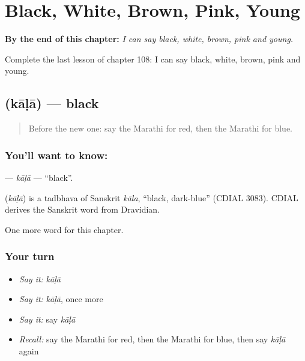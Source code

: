
\chapter{Black, White, Brown, Pink, Young}
\label{ch:mr-black-white-brown-pink-young}

\begin{chapteropening}
\textbf{By the end of this chapter:} \emph{I can say black, white, brown, pink and young.}

Complete the last lesson of chapter 108: I can say black, white, brown, pink and young.
\end{chapteropening}

\section[\texorpdfstring{\mr{काळा} (kāḷā)}{काळा (kāḷā)}]{ (kāḷā) — black}

\label{lesson:MR-C108-kala}



\begin{quote}
Before the new one: say the Marathi for red, then the Marathi for blue.
\end{quote}

\subsection*{You'll want to know: }
\textbf{} — \emph{kāḷā} — \textquotedblleft{}black\textquotedblright{}.

\begin{cousinweb}
\textbf{} (\emph{kāḷā}) is a tadbhava of Sanskrit \emph{kāla}, \textquotedblleft{}black, dark-blue\textquotedblright{} (CDIAL 3083). CDIAL derives the Sanskrit word from Dravidian.
\end{cousinweb}

\begin{grammarlens}[title={What you've built}]
One more word for this chapter.
\end{grammarlens}

\subsection*{Your turn}
\begin{itemize}
\raggedright
  \item \emph{Say it:} \emph{kāḷā}
  \item \emph{Say it:} \emph{kāḷā}, once more
  \item \emph{Say it:} say \emph{kāḷā}
  \item \emph{Recall:} say the Marathi for red, then the Marathi for blue, then say \emph{kāḷā} again
\end{itemize}

